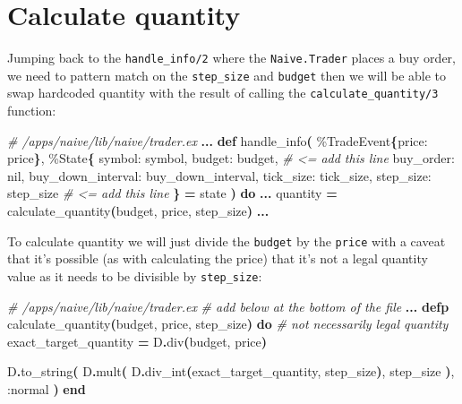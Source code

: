\documentclass[
  oneside]{book}
\newenvironment{Shaded}{\begin{snugshade}}{\end{snugshade}}
\newcommand{\CommentTok}[1]{\textcolor[rgb]{0.56,0.35,0.01}{\textit{#1}}}
\newcommand{\ConstantTok}[1]{\textcolor[rgb]{0.56,0.35,0.01}{#1}}
\newcommand{\FunctionTok}[1]{\textcolor[rgb]{0.13,0.29,0.53}{\textbf{#1}}}
\newcommand{\KeywordTok}[1]{\textcolor[rgb]{0.13,0.29,0.53}{\textbf{#1}}}
\newcommand{\NormalTok}[1]{#1}
\newcommand{\OperatorTok}[1]{\textcolor[rgb]{0.81,0.36,0.00}{\textbf{#1}}}
\newcommand{\VariableTok}[1]{\textcolor[rgb]{0.00,0.00,0.00}{#1}}
\begin{document}
\section{Calculate quantity}\label{calculate-quantity}

Jumping back to the \texttt{handle\_info/2} where the \texttt{Naive.Trader} places a buy order, we need to pattern match on the \texttt{step\_size} and \texttt{budget} then we will be able to swap hardcoded quantity with the result of calling the \texttt{calculate\_quantity/3} function:

\begin{Shaded}
\begin{Highlighting}[]
  \CommentTok{\# /apps/naive/lib/naive/trader.ex}
  \OperatorTok{...}
  \KeywordTok{def}\NormalTok{ handle\_info}\FunctionTok{(}
\NormalTok{        \%}\ConstantTok{TradeEvent}\FunctionTok{\{}\VariableTok{price:}\NormalTok{ price}\FunctionTok{\}}\NormalTok{,}
\NormalTok{        \%}\ConstantTok{State}\FunctionTok{\{}
          \VariableTok{symbol:}\NormalTok{ symbol,}
          \VariableTok{budget:}\NormalTok{ budget, }\CommentTok{\# \textless{}= add this line}
          \VariableTok{buy\_order:} \ConstantTok{nil}\NormalTok{,}
          \VariableTok{buy\_down\_interval:}\NormalTok{ buy\_down\_interval,}
          \VariableTok{tick\_size:}\NormalTok{ tick\_size,}
          \VariableTok{step\_size:}\NormalTok{ step\_size }\CommentTok{\# \textless{}= add this line}
        \FunctionTok{\}} \OperatorTok{=}\NormalTok{ state}
      \FunctionTok{)} \KeywordTok{do}
    \OperatorTok{...}
\NormalTok{    quantity }\OperatorTok{=}\NormalTok{ calculate\_quantity}\FunctionTok{(}\NormalTok{budget, price, step\_size}\FunctionTok{)}
    \OperatorTok{...}
\end{Highlighting}
\end{Shaded}

To calculate quantity we will just divide the \texttt{budget} by the \texttt{price} with a caveat that it's possible (as with calculating the price) that it's not a legal quantity value as it needs to be divisible by \texttt{step\_size}:

\begin{Shaded}
\begin{Highlighting}[]
  \CommentTok{\# /apps/naive/lib/naive/trader.ex}
  \CommentTok{\# add below at the bottom of the file}
  \OperatorTok{...}
  \KeywordTok{defp}\NormalTok{ calculate\_quantity}\FunctionTok{(}\NormalTok{budget, price, step\_size}\FunctionTok{)} \KeywordTok{do}
    \CommentTok{\# not necessarily legal quantity}
\NormalTok{    exact\_target\_quantity }\OperatorTok{=}\NormalTok{ D}\OperatorTok{.}\NormalTok{div}\FunctionTok{(}\NormalTok{budget, price}\FunctionTok{)}

\NormalTok{    D}\OperatorTok{.}\NormalTok{to\_string}\FunctionTok{(}
\NormalTok{      D}\OperatorTok{.}\NormalTok{mult}\FunctionTok{(}
\NormalTok{        D}\OperatorTok{.}\NormalTok{div\_int}\FunctionTok{(}\NormalTok{exact\_target\_quantity, step\_size}\FunctionTok{)}\NormalTok{,}
\NormalTok{        step\_size}
      \FunctionTok{)}\NormalTok{,}
      \VariableTok{:normal}
    \FunctionTok{)}
  \KeywordTok{end}
\end{Highlighting}
\end{Shaded}
\end{document}
